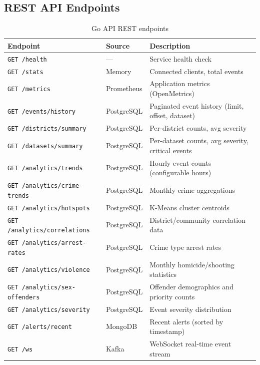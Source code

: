 \documentclass[12pt,a4paper]{article}
\begin{document}
\subsection{REST API Endpoints}

\begin{table}[H]
\centering
\caption{Go API REST endpoints}
\label{tab:api}
\begin{tabularx}{\textwidth}{l l X}
\toprule
\textbf{Endpoint} & \textbf{Source} & \textbf{Description} \\
\midrule
\texttt{GET /health} & --- & Service health check \\
\texttt{GET /stats} & Memory & Connected clients, total events \\
\texttt{GET /metrics} & Prometheus & Application metrics (OpenMetrics) \\
\midrule
\texttt{GET /events/history} & PostgreSQL & Paginated event history (limit, offset, dataset) \\
\texttt{GET /districts/summary} & PostgreSQL & Per-district counts, avg severity \\
\texttt{GET /datasets/summary} & PostgreSQL & Per-dataset counts, avg severity, critical events \\
\midrule
\texttt{GET /analytics/trends} & PostgreSQL & Hourly event counts (configurable hours) \\
\texttt{GET /analytics/crime-trends} & PostgreSQL & Monthly crime aggregations \\
\texttt{GET /analytics/hotspots} & PostgreSQL & K-Means cluster centroids \\
\texttt{GET /analytics/correlations} & PostgreSQL & District/community correlation data \\
\texttt{GET /analytics/arrest-rates} & PostgreSQL & Crime type arrest rates \\
\texttt{GET /analytics/violence} & PostgreSQL & Monthly homicide/shooting statistics \\
\texttt{GET /analytics/sex-offenders} & PostgreSQL & Offender demographics and priority counts \\
\texttt{GET /analytics/severity} & PostgreSQL & Event severity distribution \\
\midrule
\texttt{GET /alerts/recent} & MongoDB & Recent alerts (sorted by timestamp) \\
\texttt{GET /ws} & Kafka & WebSocket real-time event stream \\
\bottomrule
\end{tabularx}
\end{table}
\end{document}
